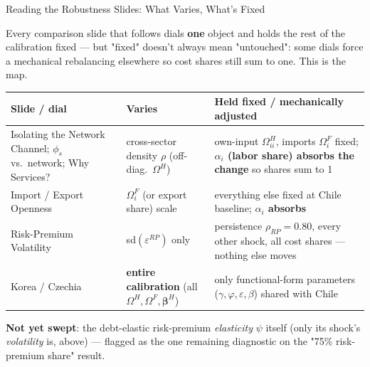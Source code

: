 \documentclass[aspectratio=43, 10pt]{beamer}
\begin{document}
\begin{frame}{Reading the Robustness Slides: What Varies, What's Fixed}

{\footnotesize Every comparison slide that follows dials \textbf{one} object and holds the rest of the calibration fixed --- but "fixed" doesn't always mean "untouched": some dials force a mechanical rebalancing elsewhere so cost shares still sum to one. This is the map.}

\vspace{4pt}
{\scriptsize
\renewcommand{\arraystretch}{1.35}
\begin{tabular}{@{}p{2.6cm}p{3.3cm}p{4.4cm}@{}}
\toprule
\textbf{Slide / dial} & \textbf{Varies} & \textbf{Held fixed / mechanically adjusted} \\
\midrule
Isolating the Network Channel; $\phi_s$ vs.\ network; Why Services? & cross-sector density $\rho$ (off-diag.\ $\Omega^H$) & own-input $\Omega^H_{ii}$, imports $\Omega^F_i$ fixed; \textbf{$\alpha_i$ (labor share) absorbs the change} so shares sum to 1 \\
Import / Export Openness & $\Omega^F_i$ (or export share) scale & everything else fixed at Chile baseline; \textbf{$\alpha_i$ absorbs} \\
Risk-Premium Volatility & sd$(\varepsilon^{RP})$ only & persistence $\rho_{RP}{=}0.80$, every other shock, all cost shares --- nothing else moves \\
Korea / Czechia & \textbf{entire calibration} (all $\Omega^H,\Omega^F,\bm\beta^H$) & only functional-form parameters ($\gamma,\varphi,\varepsilon,\beta$) shared with Chile \\
\bottomrule
\end{tabular}}

\vspace{4pt}
{\scriptsize \textbf{Not yet swept}: the debt-elastic risk-premium \emph{elasticity} $\psi$ itself (only its shock's \emph{volatility} is, above) --- flagged as the one remaining diagnostic on the "75\% risk-premium share" result.}

\end{frame}
\end{document}
